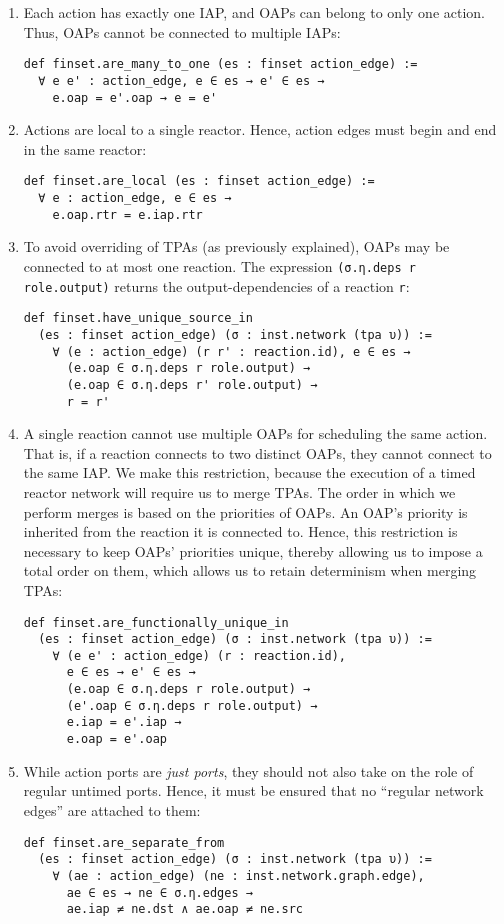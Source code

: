 \begin{enumerate}[leftmargin=14pt]
\item Each action has exactly one IAP, and OAPs can belong to only one action. Thus, OAPs cannot be connected to multiple IAPs:
\begin{lstlisting}
def finset.are_many_to_one (es : finset action_edge) :=
  ∀ e e' : action_edge, e ∈ es → e' ∈ es →
    e.oap = e'.oap → e = e'
\end{lstlisting}
\item Actions are local to a single reactor. Hence, action edges must begin and end in the same reactor:
\begin{lstlisting}
def finset.are_local (es : finset action_edge) :=
  ∀ e : action_edge, e ∈ es → 
    e.oap.rtr = e.iap.rtr
\end{lstlisting}
\item To avoid overriding of TPAs (as previously explained), OAPs may be connected to at most one reaction.
The expression \lstinline{(σ.η.deps r role.output)} returns the output-dependencies of a reaction \lstinline{r}:
\begin{lstlisting}
def finset.have_unique_source_in 
  (es : finset action_edge) (σ : inst.network (tpa υ)) :=
    ∀ (e : action_edge) (r r' : reaction.id), e ∈ es → 
      (e.oap ∈ σ.η.deps r role.output) → 
      (e.oap ∈ σ.η.deps r' role.output) → 
      r = r'
\end{lstlisting}
\item A single reaction cannot use multiple OAPs for scheduling the same action. 
That is, if a reaction connects to two distinct OAPs, they cannot connect to the same IAP.
We make this restriction, because the execution of a timed reactor network will require us to merge TPAs.
The order in which we perform merges is based on the priorities of OAPs.
An OAP's priority is inherited from the reaction it is connected to.
Hence, this restriction is necessary to keep OAPs' priorities unique, thereby allowing us to impose a total order on them, which allows us to retain determinism when merging TPAs:

\break

\begin{lstlisting}
def finset.are_functionally_unique_in 
  (es : finset action_edge) (σ : inst.network (tpa υ)) :=
    ∀ (e e' : action_edge) (r : reaction.id), 
      e ∈ es → e' ∈ es → 
      (e.oap ∈ σ.η.deps r role.output) → 
      (e'.oap ∈ σ.η.deps r role.output) → 
      e.iap = e'.iap → 
      e.oap = e'.oap
\end{lstlisting}
\item While action ports are \emph{just ports}, they should not also take on the role of regular untimed ports.
Hence, it must be ensured that no ``regular network edges'' are attached to them:
\begin{lstlisting}
def finset.are_separate_from 
  (es : finset action_edge) (σ : inst.network (tpa υ)) :=
    ∀ (ae : action_edge) (ne : inst.network.graph.edge), 
      ae ∈ es → ne ∈ σ.η.edges → 
      ae.iap ≠ ne.dst ∧ ae.oap ≠ ne.src
\end{lstlisting}
\end{enumerate}

